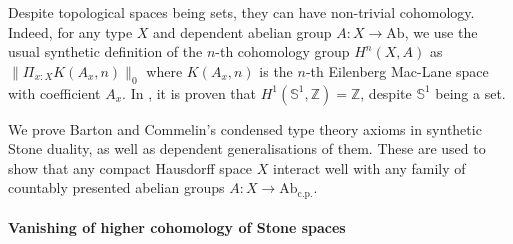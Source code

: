 \documentclass[letterpaper]{../util/easychair}
\newcommand{\Z}{\mathbb{Z}}
\newcommand{\N}{\mathbb{N}}
\newcommand{\bS}{\mathbb{S}}
\begin{document}
Despite topological spaces being sets, they can have non-trivial cohomology. Indeed, for any type $X$ and dependent abelian group $A:X\to \mathrm{Ab}$, we use the usual synthetic definition of the $n$-th cohomology group $H^n(X,A)$ as $\|\Pi_{x:X}K(A_x,n)\|_0$ where $K(A_x,n)$ is the $n$-th Eilenberg Mac-Lane space with coefficient $A_x$. In \cite{synthetic-stone-duality}, it is proven that $H^1(\bS^1,\Z)=\Z$, despite $\bS^1$ being a set.

We prove Barton and Commelin's condensed type theory axioms \cite{barton2024condensed} in synthetic Stone duality, as well as dependent generalisations of them. These are used to show that any compact Hausdorff space $X$ interact well with any family of countably presented abelian groups $A:X\to \mathrm{Ab}_{\mathrm{c.p.}}$.





\paragraph*{Vanishing of higher cohomology of Stone spaces}
\end{document}
